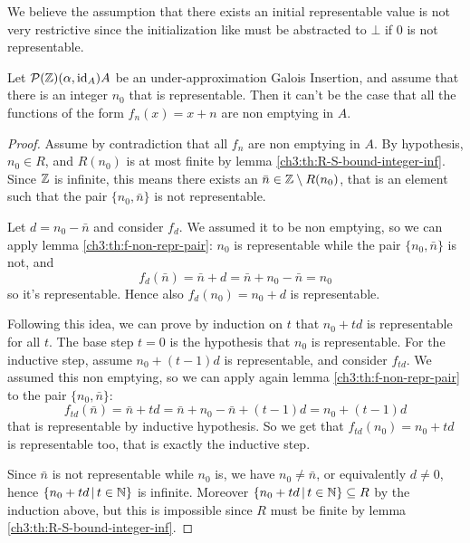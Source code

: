 We believe the assumption that there exists an initial representable value is not very restrictive since the initialization like  must be abstracted to $\bot$ if $0$ is not representable.

\begin{prop}\label{ch3:th:ne-sum-nonexsistence-inf}
	Let $\mathcal{P}(\mathbb{Z}) (\alpha, \text{id}_A) A$ be an under-approximation Galois Insertion, and assume that there is an integer $n_0$ that is representable. Then it can't be the case that all the functions of the form $f_n(x) = x + n$ are non emptying in $A$.
\end{prop}

\begin{proof}
	Assume by contradiction that all $f_n$ are non emptying in $A$.
	By hypothesis, $n_0 \in R$, and $R(n_0)$ is at most finite by lemma \ref{ch3:th:R-S-bound-integer-inf}. Since $\mathbb{Z}$ is infinite, this means there exists an $\bar{n} \in \mathbb{Z} \setminus R(n_0)$, that is an element such that the pair $\{ n_0, \bar{n} \}$ is not representable.

	Let $d = n_0 - \bar{n}$ and consider $f_d$. We assumed it to be non emptying, so we can apply lemma \ref{ch3:th:f-non-repr-pair}: $n_0$ is representable while the pair $\{ n_0, \bar{n} \}$ is not, and
	\[
	f_d(\bar{n}) = \bar{n} + d = \bar{n} + n_0 - \bar{n} = n_0
	\]
	so it's representable. Hence also $f_d(n_0) = n_0 + d$ is representable.

	Following this idea, we can prove by induction on $t$ that $n_0 + t d$ is representable for all $t$. The base step $t = 0$ is the hypothesis that $n_0$ is representable.
	For the inductive step, assume $n_0 + (t - 1) d$ is representable, and consider $f_{t d}$. We assumed this non emptying, so we can apply again lemma \ref{ch3:th:f-non-repr-pair} to the pair $\{ n_0, \bar{n} \}$:
	\[
	f_{t d}(\bar{n}) = \bar{n} + t d = \bar{n} + n_0 - \bar{n} + (t - 1) d = n_0 + (t - 1) d
	\]
	that is representable by inductive hypothesis. So we get that $f_{t d}(n_0) = n_0 + t d$ is representable too, that is exactly the inductive step.

	Since $\bar{n}$ is not representable while $n_0$ is, we have $n_0 \neq \bar{n}$, or equivalently $d \neq 0$, hence $\{ n_0 + t d \,\vert\, t \in \mathbb{N} \}$ is infinite.
	Moreover $\{ n_0 + t d \,\vert\, t \in \mathbb{N} \} \subseteq R$ by the induction above, but this is impossible since $R$ must be finite by lemma \ref{ch3:th:R-S-bound-integer-inf}.
\end{proof}

